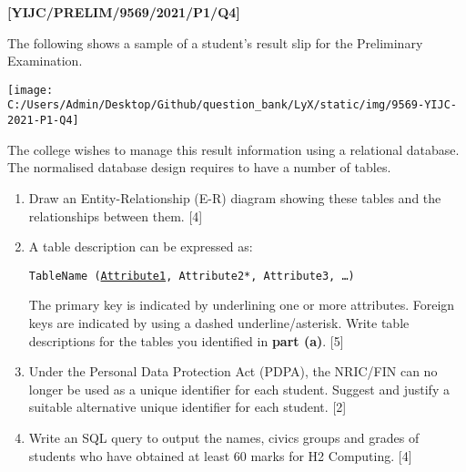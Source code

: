 \item \textbf{{[}YIJC/PRELIM/9569/2021/P1/Q4{]} }

The following shows a sample of a student\textquoteright s result
slip for the Preliminary Examination. 
\noindent \begin{center}
\texttt{[image: C:/Users/Admin/Desktop/Github/question\_bank/LyX/static/img/9569-YIJC-2021-P1-Q4]}
\par\end{center}

The college wishes to manage this result information using a relational
database. The normalised database design requires to have a number
of tables. 
\begin{enumerate}
\item Draw an Entity-Relationship (E-R) diagram showing these tables and
the relationships between them. \hfill{}{[}4{]}
\item A table description can be expressed as: 

\texttt{TableName (}\texttt{\uline{Attribute1}}\texttt{, Attribute2{*},
Attribute3, \dots ) }

The primary key is indicated by underlining one or more attributes.
Foreign keys are indicated by using a dashed underline/asterisk. Write
table descriptions for the tables you identified in \textbf{part (a)}.
\hfill{} {[}5{]}
\item Under the Personal Data Protection Act (PDPA), the NRIC/FIN can no
longer be used as a unique identifier for each student. Suggest and
justify a suitable alternative unique identifier for each student.
\hfill{}{[}2{]}
\item Write an SQL query to output the names, civics groups and grades of
students who have obtained at least 60 marks for H2 Computing. \hfill{}{[}4{]}
\end{enumerate}